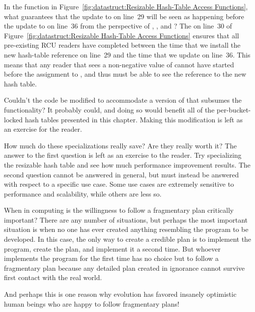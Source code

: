 \QuickQ{}
	In the  function in
	Figure~\ref{fig:datastruct:Resizable Hash-Table Access Functions},
	what guarantees that the update to  on line~29
	will be seen as happening before the update to 
	on line~36 from the perspective of ,
	, and ?
\QuickA{}
	The  on line~30 of
	Figure~\ref{fig:datastruct:Resizable Hash-Table Access Functions}
	ensures that all pre-existing RCU readers have completed between
	the time that we install the new hash-table reference on
	line~29 and the time that we update  on
	line~36.
	This means that any reader that sees a non-negative value
	of  cannot have started before the
	assignment to , and thus must be able to see
	the reference to the new hash table.

\QuickQ{}
	Couldn't the  code be modified to accommodate
	a version of  that subsumes the
	 functionality?
\QuickA{}
	It probably could, and doing so would benefit all of the
	per-bucket-locked hash tables presented in this chapter.
	Making this modification is left as an exercise for the
	reader.

\QuickQ{}
	How much do these specializations really save?
	Are they really worth it?
\QuickA{}
	The answer to the first question is left as an exercise to
	the reader.
	Try specializing the resizable hash table and see how much
	performance improvement results.
	The second question cannot be answered in general, but must
	instead be answered with respect to a specific use case.
	Some use cases are extremely sensitive to performance and
	scalability, while others are less so.

\QuickQ{}
	When in computing is the willingness to follow a fragmentary
	plan critically important?
\QuickA{}
	There are any number of situations, but perhaps the most important
	situation is when no one has ever created anything resembling
	the program to be developed.
	In this case, the only way to create a credible plan is to
	implement the program, create the plan, and implement it a
	second time.
	But whoever implements the program for the first time has no
	choice but to follow a fragmentary plan because any detailed
	plan created in ignorance cannot survive first contact with
	the real world.

	And perhaps this is one reason why evolution has favored insanely
	optimistic human beings who are happy to follow fragmentary plans!

